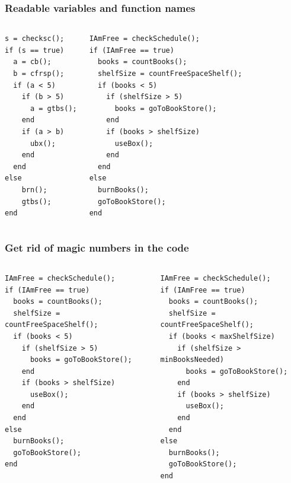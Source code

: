 \begin{frame}[fragile]
 \frametitle{Readable variables and function names}
 \begin{columns}[T]
\begin{lstlisting}
s = checksc();
if (s == true)
  a = cb();
  b = cfrsp();
  if (a < 5)
    if (b > 5)
      a = gtbs();
    end
    if (a > b)
      ubx();
    end
  end
else
    brn();
    gtbs();
end
 \end{lstlisting}
     \begin{lstlisting}
IAmFree = checkSchedule();
if (IAmFree == true)
  books = countBooks();
  shelfSize = countFreeSpaceShelf();
  if (books < 5)
    if (shelfSize > 5)
      books = goToBookStore();
    end
    if (books > shelfSize)
      useBox();
    end
  end
else
  burnBooks();
  goToBookStore();
end
 \end{lstlisting}
 \end{columns}
\end{frame}

\begin{frame}[fragile]
 \frametitle{Get rid of magic numbers in the code}
 \begin{columns}[T]
     \begin{lstlisting}[basicstyle=\scriptsize\ttfamily]
IAmFree = checkSchedule();
if (IAmFree == true)
  books = countBooks();
  shelfSize = countFreeSpaceShelf();
  if (books < 5)
    if (shelfSize > 5)
      books = goToBookStore();
    end
    if (books > shelfSize)
      useBox();
    end
  end
else
  burnBooks();
  goToBookStore();
end
 \end{lstlisting}
     \begin{lstlisting}[basicstyle=\scriptsize\ttfamily,emph={minBooksNeeded,maxShelfSize},emphstyle=\color{red}]
IAmFree = checkSchedule();
if (IAmFree == true)
  books = countBooks();
  shelfSize = countFreeSpaceShelf();
  if (books < maxShelfSize)
    if (shelfSize > minBooksNeeded)
      books = goToBookStore();
    end
    if (books > shelfSize)
      useBox();
    end
  end
else
  burnBooks();
  goToBookStore();
end
 \end{lstlisting}
 \end{columns}
\end{frame}


